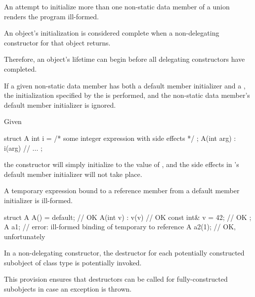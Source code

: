 \pnum
An attempt to initialize more than one non-static data member of a union renders the
program ill-formed.

\pnum
An object's initialization is considered complete when
a non-delegating constructor for that object returns.
\begin{note}
Therefore, an object's lifetime can begin
before all delegating constructors have completed.
\end{note}

\pnum
If a given non-static data member has both a default member initializer
and a , the initialization specified by the
 is performed, and the non-static data member's
default member initializer is ignored.
\begin{example}
Given
\begin{codeblock}
struct A {
  int i = /* some integer expression with side effects */ ;
  A(int arg) : i(arg) { }
  // ...
};
\end{codeblock}
the  constructor will simply initialize  to the value of
, and the
%
side effects in 's default member initializer
will not take place.
\end{example}

\pnum
A temporary expression bound to a reference member from a
default member initializer is ill-formed.
\begin{example}
\begin{codeblock}
struct A {
  A() = default;        // OK
  A(int v) : v(v) { }   // OK
  const int& v = 42;    // OK
};
A a1;                   // error: ill-formed binding of temporary to reference
A a2(1);                // OK, unfortunately
\end{codeblock}
\end{example}

\pnum
In a non-delegating constructor, the destructor for each potentially constructed
subobject of class type is potentially invoked.
\begin{note}
This provision ensures that destructors can be called for fully-constructed
subobjects in case an exception is thrown.
\end{note}

